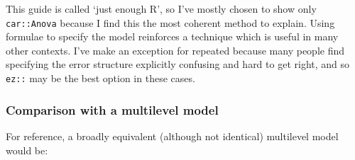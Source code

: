 \documentclass[]{article}
\newenvironment{Shaded}{\begin{snugshade}}{\end{snugshade}}
\newcommand{\DataTypeTok}[1]{\textcolor[rgb]{0.13,0.29,0.53}{#1}}
\newcommand{\DecValTok}[1]{\textcolor[rgb]{0.00,0.00,0.81}{#1}}
\newcommand{\KeywordTok}[1]{\textcolor[rgb]{0.13,0.29,0.53}{\textbf{#1}}}
\newcommand{\NormalTok}[1]{#1}
\newcommand{\OperatorTok}[1]{\textcolor[rgb]{0.81,0.36,0.00}{\textbf{#1}}}
\newcommand{\StringTok}[1]{\textcolor[rgb]{0.31,0.60,0.02}{#1}}
\begin{document}
This guide is called `just enough R', so I've mostly chosen to show only
\texttt{car::Anova} because I find this the most coherent method to explain. Using
formulae to specify the model reinforces a technique which is useful in many
other contexts. I've make an exception for repeated because many people find
specifying the error structure explicitly confusing and hard to get right, and
so \texttt{ez::} may be the best option in these cases.

\hypertarget{comparison-with-a-multilevel-model}{%
\subsubsection*{Comparison with a multilevel model}\label{comparison-with-a-multilevel-model}}

For reference, a broadly equivalent (although not identical) multilevel model
would be:

\begin{Shaded}
\end{Shaded}
\end{document}

